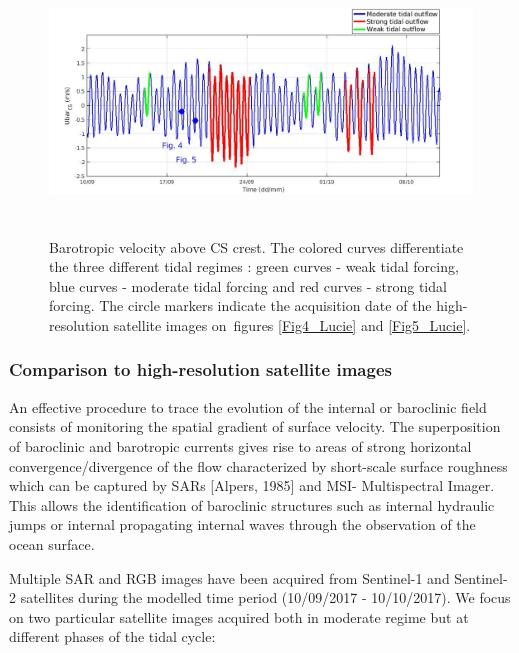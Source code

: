 \begin{figure}[!h]
	\begin{Center}
		\includegraphics[width=6.3in,height=2.75in]{./media/image2.jpg}
	\end{Center}


\caption{Barotropic velocity above CS crest. The colored curves differentiate the three different tidal regimes : green curves - weak tidal forcing, blue curves - moderate tidal forcing and red curves - strong tidal forcing. The circle markers indicate the acquisition date of the high-resolution satellite images on\  figures \ref{Fig4_Lucie} and \ref{Fig5_Lucie}.}
\label{Fig2_Lucie}
\end{figure}

\subsubsection{Comparison to high-resolution satellite images}

\vspace{\baselineskip}
An effective procedure to trace the evolution of the internal or baroclinic field consists of monitoring the spatial gradient of surface velocity. The superposition of baroclinic and barotropic currents gives rise to areas of strong horizontal convergence/divergence of the flow characterized by short-scale surface roughness which can be captured by SARs [Alpers, 1985] and MSI- Multispectral Imager. This allows the identification of baroclinic structures such as internal hydraulic jumps or internal propagating internal waves through the observation of the ocean surface. \par


\vspace{\baselineskip}
Multiple SAR and RGB images have been acquired from Sentinel-1 and Sentinel-2 satellites during the modelled time period (10/09/2017 - 10/10/2017). We focus on two particular satellite images acquired both in moderate regime but at different phases of the tidal cycle: \par

